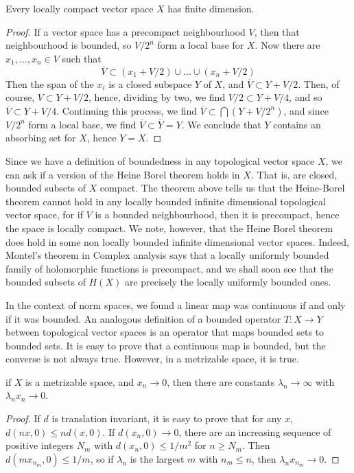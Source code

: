 \begin{theorem}
    Every locally compact vector space $X$ has finite dimension.
\end{theorem}
\begin{proof}
    If a vector space has a precompact neighbourhood $V$, then that neighbourhood is bounded, so $V/2^n$ form a local base for $X$. Now there are $x_1, \dots, x_n \in V$ such that
    \[ \overline{V} \subset (x_1 + V/2) \cup \dots \cup (x_n + V/2) \]
    Then the span of the $x_i$ is a closed subspace $Y$ of $X$, and $\overline{V} \subset Y + V/2$. Then, of course, $V \subset Y + V/2$, hence, dividing by two, we find $V/2 \subset Y + V/4$, and so $\overline{V} \subset Y + V/4$. Continuing this process, we find $\overline{V} \subset \bigcap (Y + V/2^n)$, and since $V/2^n$ form a local base, we find $\overline{V} \subset \overline{Y} = Y$. We conclude that $Y$ contains an absorbing set for $X$, hence $Y = X$.
\end{proof}

Since we have a definition of boundedness in any topological vector space $X$, we can ask if a version of the Heine Borel theorem holds in $X$. That is, are closed, bounded subsets of $X$ compact. The theorem above tells us that the Heine-Borel theorem cannot hold in any locally bounded infinite dimensional topological vector space, for if $V$ is a bounded neighbourhood, then it is precompact, hence the space is locally compact. We note, however, that the Heine Borel theorem does hold in some non locally bounded infinite dimensional vector spaces. Indeed, Montel's theorem in Complex analysis says that a locally uniformly bounded family of holomorphic functions is precompact, and we shall soon see that the bounded subsets of $H(X)$ are precisely the locally uniformly bounded ones.

In the context of norm spaces, we found a linear map was continuous if and only if it was bounded. An analogous definition of a bounded operator $T: X \to Y$ between topological vector spaces is an operator that maps bounded sets to bounded sets. It is easy to prove that a continuous map is bounded, but the converse is not always true. However, in a metrizable space, it is true.

\begin{lemma}
    if $X$ is a metrizable space, and $x_n \to 0$, then there are constants $\lambda_n \to \infty$ with $\lambda_n x_n \to 0$.
\end{lemma}
\begin{proof}
    If $d$ is translation invariant, it is easy to prove that for any $x$, $d(nx,0) \leq n d(x,0)$. If $d(x_n,0) \to 0$, there are an increasing sequence of positive integers $N_m$ with $d(x_n,0) \leq 1/m^2$ for $n \geq N_m$. Then $d(mx_{n_m},0) \leq 1/m$, so if $\lambda_n$ is the largest $m$ with $n_m \leq n$, then $\lambda_n x_{n_m} \to 0$.
\end{proof}

